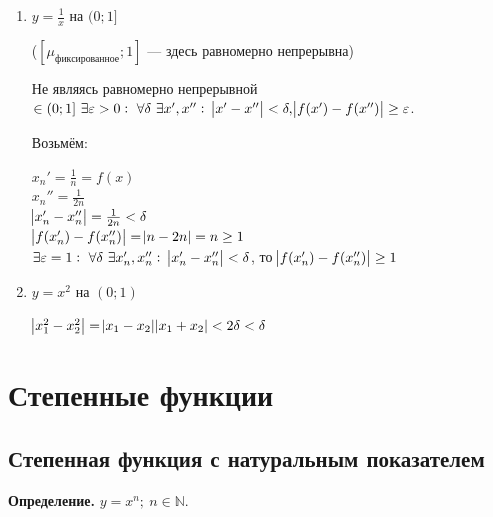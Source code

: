 \documentclass{article}
\begin{document}
    \begin{enumerate}
        \item \( y = \frac{1}{x} \) на \( (0; 1] \)

        (\( [\mu_{\textrm{фиксированное}}; 1] \) --- здесь равномерно непрерывна)
    
        Не являясь равномерно непрерывной \( \in (0; 1]\ \exists \varepsilon > 0:\ \forall \delta\ \exists x', x'':\ \abs{x' - x''} < \delta, \abs{f(x') - f(x'')} \geq \varepsilon \).
        
        Возьмём:
    
        \( x_n' = \frac{1}{n} = f(x) \)\\
        \( x_n'' = \frac{1}{2n} \)\\
        \( \abs{x_n' - x_n''} = \frac{1}{2n} < \delta \)\\
        \( \abs{f(x_n') - f(x_n'')} = \abs{n - 2n} = n \geq 1 \)\\
        \( \exists \varepsilon = 1:\ \forall \delta\ \exists x_n', x_n'':\ \abs{x_n' - x_n''} < \delta \), то \( \abs{f(x_n') - f(x_n'')} \geq 1\)
        
        \item \( y = x^2 \) на \( (0; 1) \)
        
        \( \abs{x_1^2 - x_2^2} = \abs{x_1 - x_2}\abs{x_1 + x_2} < 2\delta < \delta \)
    \end{enumerate}
    
    \section{Степенные функции}

    \subsection{Степенная функция с натуральным показателем}

    \textbf{Определение.} \(y = x^n;\ n \in \mathbb{N}\).
    
\end{document}
